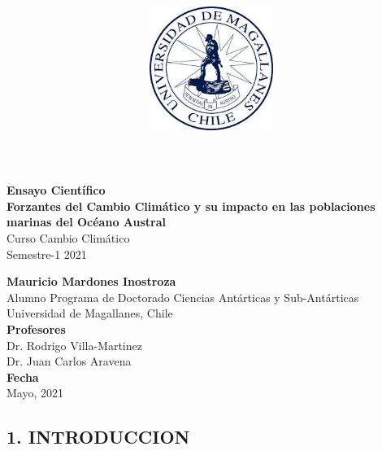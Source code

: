 \documentclass[
]{article}
\title{\includegraphics[width=4cm,height=\textheight]{logoUMAG.jpg}}
\author{}
\date{\vspace{-2.5em}}
\begin{document}
\maketitle



\begin{flushleft}
\Large{\textbf{Ensayo Científico}}\\
\vspace*{2\baselineskip}
\LARGE{\textbf{Forzantes del Cambio Climático y su impacto en las poblaciones marinas del Océano Austral}}\\
\vspace*{3\baselineskip}
\Large{Curso Cambio Climático}\\
\Large{Semestre-1 2021 }\\
\vspace*{4\baselineskip}
\end{flushleft}
\begin{flushright}
\large{\textbf{Mauricio Mardones Inostroza}}\\
\vspace*{2\baselineskip}
\normalsize{Alumno Programa de Doctorado Ciencias Antárticas y Sub-Antárticas}\\
\vspace*{1\baselineskip}
\normalsize{Universidad de Magallanes, Chile}\\
\vspace*{1\baselineskip}
\normalsize{\textbf{Profesores}}\\
Dr. Rodrigo Villa-Martinez\\
Dr. Juan Carlos Aravena\\
\vspace*{1\baselineskip}
\normalsize{\textbf{Fecha}}\\
Mayo, 2021
\end{flushright}



\hypersetup{linkcolor = black}
\newpage
{}

\newpage



\hypersetup{linkcolor = blue}

\fontsize{12}{26}
\selectfont{}

\hypertarget{introduccion}{%
\subsection{1. INTRODUCCION}\label{introduccion}}
\end{document}
